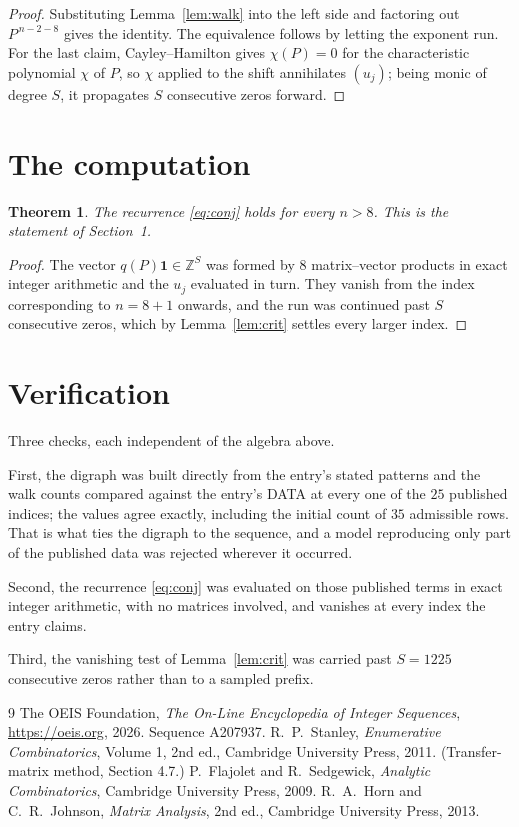\documentclass[11pt,a4paper]{article}
\theoremstyle{plain}
\newtheorem{theorem}{Theorem}
\theoremstyle{definition}
\begin{document}
\begin{proof}
Substituting Lemma~\ref{lem:walk} into the left side and factoring out
$P^{\,n-2-8}$ gives the identity. The equivalence follows by letting the exponent
run. For the last claim, Cayley--Hamilton gives $\chi(P)=0$ for the characteristic
polynomial $\chi$ of $P$, so $\chi$ applied to the shift annihilates $(u_j)$; being monic of
degree $S$, it propagates $S$ consecutive zeros forward.
\end{proof}

\section{The computation}

\begin{theorem}
The recurrence \eqref{eq:conj} holds for every $n>8$. This is the statement of
Section~1.
\end{theorem}

\begin{proof}
The vector $q(P)\mathbf{1}\in\mathbb{Z}^{S}$ was formed by $8$ matrix--vector
products in exact integer arithmetic and the $u_j$ evaluated in turn. They vanish from the
index corresponding to $n=8+1$ onwards, and the run was continued past $S$ consecutive
zeros, which by Lemma~\ref{lem:crit} settles every larger index.
\end{proof}

\section{Verification}

Three checks, each independent of the algebra above.

First, the digraph was built directly from the entry's stated patterns and the walk counts
compared against the entry's DATA at every one of the $25$ published indices; the
values agree exactly, including the initial count of $35$ admissible rows. That is
what ties the digraph to the sequence, and a model reproducing only part of the published
data was rejected wherever it occurred.

Second, the recurrence \eqref{eq:conj} was evaluated on those published terms in exact
integer arithmetic, with no matrices involved, and vanishes at every index the entry claims.

Third, the vanishing test of Lemma~\ref{lem:crit} was carried past $S=1225$ consecutive
zeros rather than to a sampled prefix.

\begin{thebibliography}{9}
 The OEIS Foundation, \emph{The On-Line Encyclopedia of Integer
Sequences}, \url{https://oeis.org}, 2026. Sequence A207937.
 R.~P.~Stanley, \emph{Enumerative Combinatorics}, Volume 1, 2nd ed.,
Cambridge University Press, 2011. (Transfer-matrix method, Section 4.7.)
 P.~Flajolet and R.~Sedgewick, \emph{Analytic Combinatorics}, Cambridge
University Press, 2009.
 R.~A.~Horn and C.~R.~Johnson, \emph{Matrix Analysis}, 2nd ed., Cambridge
University Press, 2013.
\end{thebibliography}
\end{document}
